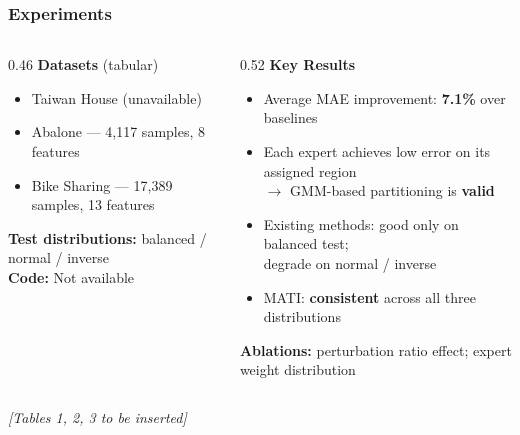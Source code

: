 \documentclass[10pt,aspectratio=169]{beamer}
\begin{document}
\begin{frame}
\frametitle{Experiments}
{\small
\begin{columns}[T]
\begin{column}{0.46\textwidth}
\textbf{Datasets} {\scriptsize (tabular)}
\begin{itemize}\setlength\itemsep{1pt}
  \item Taiwan House (unavailable)
  \item Abalone --- 4{,}117 samples, 8 features
  \item Bike Sharing --- 17{,}389 samples, 13 features
\end{itemize}

\vspace{4pt}
\textbf{Test distributions:} balanced / normal / inverse\\[4pt]
\textbf{Code:} Not available
\end{column}
\begin{column}{0.52\textwidth}
\textbf{Key Results}
{\scriptsize
\begin{itemize}\setlength\itemsep{2pt}
  \item Average MAE improvement: \textbf{7.1\%} over baselines
  \item Each expert achieves low error on its assigned region\\
        $\rightarrow$ GMM-based partitioning is \textbf{valid}
  \item Existing methods: good only on balanced test;\\
        degrade on normal / inverse
  \item MATI: \textbf{consistent} across all three distributions
\end{itemize}
}
\vspace{4pt}
{\scriptsize
\textbf{Ablations:} perturbation ratio effect; expert weight distribution
}
\end{column}
\end{columns}
\vspace{6pt}
\begin{center}
{\footnotesize \textit{[Tables 1, 2, 3 to be inserted]}}
\end{center}
}
\end{frame}
\end{document}
